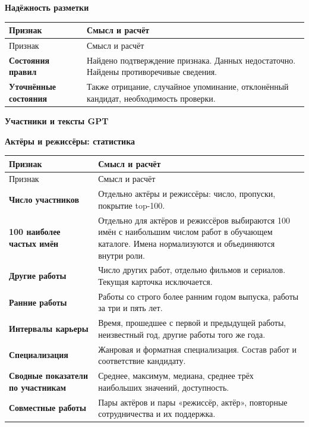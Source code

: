 \documentclass[11pt,a4paper]{article}
\begin{document}
\textbf{Надёжность разметки}


\begin{longtable}{>{\raggedright\arraybackslash}p{4.1cm}>{\raggedright\arraybackslash}p{10.8cm}}
\toprule
Признак & Смысл и расчёт \\
\midrule
\endfirsthead
\toprule
Признак & Смысл и расчёт \\
\midrule
\endhead
\textbf{Состояния правил} & Найдено подтверждение признака. Данных недостаточно. Найдены противоречивые сведения. \\[4pt]
\textbf{Уточнённые состояния} & Также отрицание, случайное упоминание, отклонённый кандидат, необходимость проверки. \\[4pt]
\bottomrule
\end{longtable}

\textbf{Участники и тексты GPT}

\textbf{Актёры и режиссёры: статистика}


\begin{longtable}{>{\raggedright\arraybackslash}p{4.1cm}>{\raggedright\arraybackslash}p{10.8cm}}
\toprule
Признак & Смысл и расчёт \\
\midrule
\endfirsthead
\toprule
Признак & Смысл и расчёт \\
\midrule
\endhead
\textbf{Число участников} & Отдельно актёры и режиссёры: число, пропуски, покрытие top-100. \\[4pt]
\textbf{100 наиболее частых имён} & Отдельно для актёров и режиссёров выбираются 100 имён с наибольшим числом работ в обучающем каталоге. Имена нормализуются и объединяются внутри роли. \\[4pt]
\textbf{Другие работы} & Число других работ, отдельно фильмов и сериалов. Текущая карточка исключается. \\[4pt]
\textbf{Ранние работы} & Работы со строго более ранним годом выпуска, работы за три и пять лет. \\[4pt]
\textbf{Интервалы карьеры} & Время, прошедшее с первой и предыдущей работы, неизвестный год, другие работы того же года. \\[4pt]
\textbf{Специализация} & Жанровая и форматная специализация. Состав работ и соответствие кандидату. \\[4pt]
\textbf{Сводные показатели по участникам} & Среднее, максимум, медиана, среднее трёх наибольших значений, доступность. \\[4pt]
\textbf{Совместные работы} & Пары актёров и пары «режиссёр, актёр», повторные сотрудничества и их поддержка. \\[4pt]
\bottomrule
\end{longtable}
\end{document}
